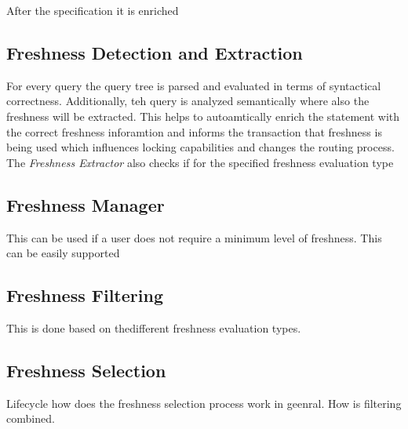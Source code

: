 After the specification it is enriched 

\subsection{Freshness Detection and Extraction}

For every query the query tree is parsed and evaluated in terms of syntactical correctness. Additionally, teh query is analyzed semantically where also the 
freshness will be extracted. This helps to autoamtically enrich the statement with the correct freshness inforamtion and informs the transaction that freshness is being used
which influences locking capabilities and changes the routing process.
The \textit{Freshness Extractor} also checks if for the specified freshness evaluation type



\subsection{Freshness Manager}






This can be used if a user does not require a minimum level of freshness. This can be easily supported  


\subsection{Freshness Filtering}
This is done based on thedifferent freshness evaluation types.


\subsection{Freshness Selection}
Lifecycle how does the freshness selection process work in geenral. How is filtering combined. 

